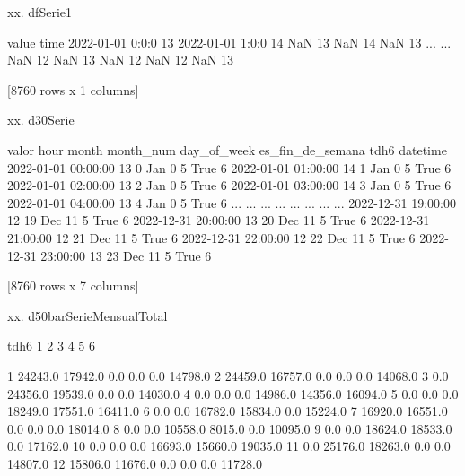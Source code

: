 \documentclass[a4paper,10pt,twocolumn]{article}
\begin{document}
\begin{Form}
xx. dfSerie1

                  value
time                   
2022-01-01 0:0:0     13
2022-01-01 1:0:0     14
NaN                  13
NaN                  14
NaN                  13
...                 ...
NaN                  12
NaN                  13
NaN                  12
NaN                  12
NaN                  13

[8760 rows x 1 columns]

xx. d30Serie

                     valor  hour month  month_num  day_of_week  es_fin_de_semana  tdh6
datetime                                                                              
2022-01-01 00:00:00     13     0   Jan          0            5              True     6
2022-01-01 01:00:00     14     1   Jan          0            5              True     6
2022-01-01 02:00:00     13     2   Jan          0            5              True     6
2022-01-01 03:00:00     14     3   Jan          0            5              True     6
2022-01-01 04:00:00     13     4   Jan          0            5              True     6
...                    ...   ...   ...        ...          ...               ...   ...
2022-12-31 19:00:00     12    19   Dec         11            5              True     6
2022-12-31 20:00:00     13    20   Dec         11            5              True     6
2022-12-31 21:00:00     12    21   Dec         11            5              True     6
2022-12-31 22:00:00     12    22   Dec         11            5              True     6
2022-12-31 23:00:00     13    23   Dec         11            5              True     6

[8760 rows x 7 columns]

xx. d50barSerieMensualTotal

tdh6        1        2        3        4        5        6
                                                          
1     24243.0  17942.0      0.0      0.0      0.0  14798.0
2     24459.0  16757.0      0.0      0.0      0.0  14068.0
3         0.0  24356.0  19539.0      0.0      0.0  14030.0
4         0.0      0.0      0.0  14986.0  14356.0  16094.0
5         0.0      0.0      0.0  18249.0  17551.0  16411.0
6         0.0      0.0  16782.0  15834.0      0.0  15224.0
7     16920.0  16551.0      0.0      0.0      0.0  18014.0
8         0.0      0.0  10558.0   8015.0      0.0  10095.0
9         0.0      0.0  18624.0  18533.0      0.0  17162.0
10        0.0      0.0      0.0  16693.0  15660.0  19035.0
11        0.0  25176.0  18263.0      0.0      0.0  14807.0
12    15806.0  11676.0      0.0      0.0      0.0  11728.0
\fi
\end{Form}
\end{document}
